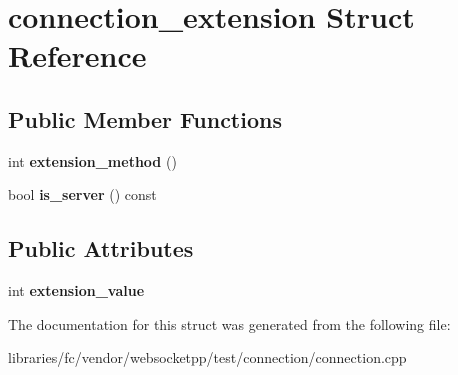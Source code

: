 \hypertarget{structconnection__extension}{}\section{connection\+\_\+extension Struct Reference}
\label{structconnection__extension}
\subsection*{Public Member Functions}
\begin{DoxyCompactItemize}
\item 
\mbox{\label{structconnection__extension_ad2436b6e3953940e8e0ca995c5b003e7}} 
int {\bfseries extension\+\_\+method} ()
\item 
\mbox{\label{structconnection__extension_a90b4a4663b04e2514ad8bc704988100b}} 
bool {\bfseries is\+\_\+server} () const
\end{DoxyCompactItemize}
\subsection*{Public Attributes}
\begin{DoxyCompactItemize}
\item 
\mbox{\label{structconnection__extension_a4e5b9636e552953e476719b0fd596c8b}} 
int {\bfseries extension\+\_\+value}
\end{DoxyCompactItemize}


The documentation for this struct was generated from the following file\+:\begin{DoxyCompactItemize}
\item 
libraries/fc/vendor/websocketpp/test/connection/connection.\+cpp\end{DoxyCompactItemize}
